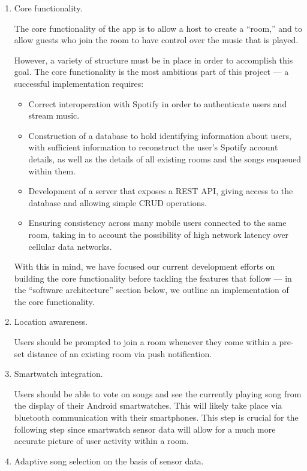 \documentclass[12pt]{article}
\begin{document}
\begin{enumerate}
\item Core functionality.

The core functionality of the app is to allow a host to create a ``room,''
and to allow guests who join the room to have control over the music
that is played.

However, a variety of structure must be in place in order to
accomplish this goal. The core functionality is the most ambitious
part of this project --- a successful implementation requires:
\begin{itemize}
\item Correct interoperation with Spotify in order to authenticate
  users and stream music.
\item Construction of a database to hold identifying information about
  users, with sufficient information to reconstruct the user's Spotify
  account details, as well as the details of all existing rooms and
  the songs enqueued within them.
\item Development of a server that exposes a REST API, giving access
  to the database and allowing simple CRUD operations.
\item Ensuring consistency across many mobile users connected to the
  same room, taking in to account the possibility of high network
  latency over cellular data networks.
\end{itemize}

With this in mind, we have focused our current development efforts on
building the core functionality before tackling the features that
follow --- in the ``software architecture'' section below, we outline
an implementation of the core functionality.

\item Location awareness.

Users should be prompted to join a room whenever they come within a
pre-set distance of an existing room via push notification.

\item Smartwatch integration.

  Users should be able to vote on songs and see the currently playing
  song from the display of their Android smartwatches. This will
  likely take place via bluetooth communication with their
  smartphones. This step is crucial for the following step since
  smartwatch sensor data will allow for a much more accurate picture
  of user activity within a room.

\item Adaptive song selection on the basis of sensor data.


\end{enumerate}
\end{document}
